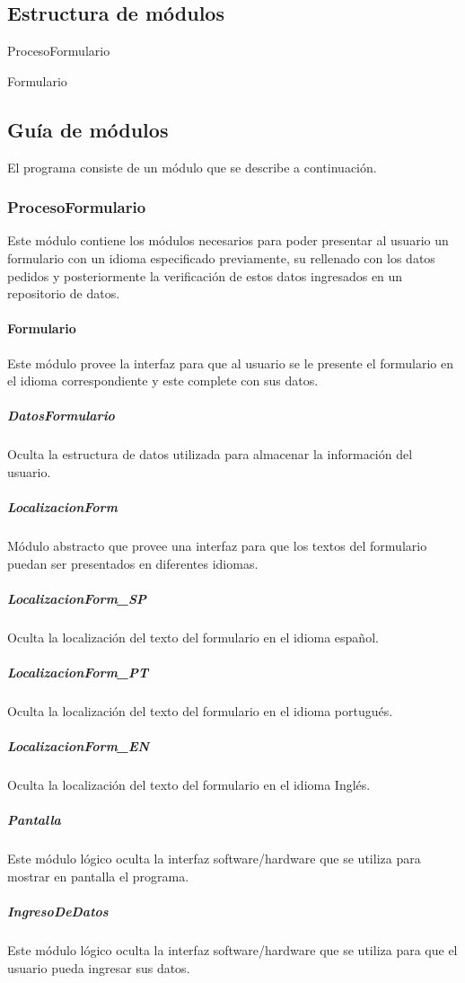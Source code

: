 \documentclass[12pt,a4paper,fleqn]{article}
\begin{document}
\subsection{Estructura de módulos}

\begin{module}{ProcesoFormulario}
\compr
{}
\eproc
{}
\end{module}

\begin{module}{Formulario}
\compr
{}
\eproc
{}
\end{module}

\subsection{Guía de módulos}
El programa consiste de un módulo que se describe a continuación.

\subsubsection{\bf{ProcesoFormulario}}
Este módulo contiene los módulos necesarios para poder presentar al usuario 
un formulario con un idioma especificado previamente, su rellenado con los datos
pedidos y posteriormente la verificación de estos datos ingresados en un
repositorio de datos.

\paragraph{Formulario}
Este módulo provee la interfaz para que al usuario se le presente el formulario
en el idioma correspondiente y este complete con sus datos.
\subparagraph{DatosFormulario}
Oculta la estructura de datos utilizada para almacenar la información del usuario.
\subparagraph{LocalizacionForm}
Módulo abstracto que provee una interfaz para que los textos del formulario puedan ser
presentados en diferentes idiomas.
\subparagraph{LocalizacionForm\_SP}
Oculta la localización del texto del formulario en el idioma español.
\subparagraph{LocalizacionForm\_PT}
Oculta la localización del texto del formulario en el idioma portugués.
\subparagraph{LocalizacionForm\_EN}
Oculta la localización del texto del formulario en el idioma Inglés.
\subparagraph{Pantalla}
Este módulo lógico oculta la interfaz software/hardware que se utiliza para
mostrar en pantalla el programa.
\subparagraph{IngresoDeDatos}
Este módulo lógico oculta la interfaz software/hardware que se utiliza para
que el usuario pueda ingresar sus datos.
\end{document}

